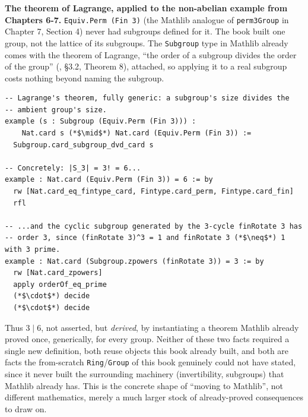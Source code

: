 \textbf{The theorem of Lagrange, applied to the non-abelian example from Chapters 6-7.} \texttt{Equiv.Perm (Fin 3)} (the Mathlib analogue of \texttt{perm3Group} in Chapter 7, Section 4) never had subgroups defined for it. The book built one group, not the lattice of its subgroups. The \texttt{Subgroup} type in Mathlib already comes with the theorem of Lagrange, ``the order of a subgroup divides the order of the group'' (\cite{DummitFoote2003}, §3.2, Theorem 8), attached, so applying it to a real subgroup costs nothing beyond naming the subgroup.

\begin{lstlisting}
-- Lagrange's theorem, fully generic: a subgroup's size divides the
-- ambient group's size.
example (s : Subgroup (Equiv.Perm (Fin 3))) :
    Nat.card s (*$\mid$*) Nat.card (Equiv.Perm (Fin 3)) :=
  Subgroup.card_subgroup_dvd_card s

-- Concretely: |S_3| = 3! = 6...
example : Nat.card (Equiv.Perm (Fin 3)) = 6 := by
  rw [Nat.card_eq_fintype_card, Fintype.card_perm, Fintype.card_fin]
  rfl

-- ...and the cyclic subgroup generated by the 3-cycle finRotate 3 has
-- order 3, since (finRotate 3)^3 = 1 and finRotate 3 (*$\neq$*) 1 with 3 prime.
example : Nat.card (Subgroup.zpowers (finRotate 3)) = 3 := by
  rw [Nat.card_zpowers]
  apply orderOf_eq_prime
  (*$\cdot$*) decide
  (*$\cdot$*) decide
\end{lstlisting}

Thus \(3 \mid 6\), not asserted, but \emph{derived}, by instantiating a theorem Mathlib already proved once, generically, for every group. Neither of these two facts required a single new definition, both reuse objects this book already built, and both are facts the from-scratch \texttt{Ring}/\texttt{Group} of this book genuinely could not have stated, since it never built the surrounding machinery (invertibility, subgroups) that Mathlib already has. This is the concrete shape of ``moving to Mathlib'', not different mathematics, merely a much larger stock of already-proved consequences to draw on.
